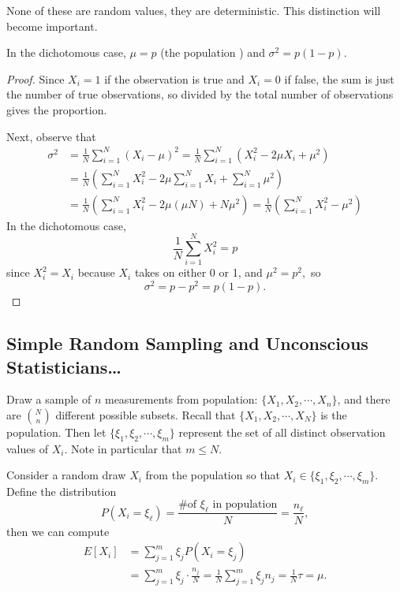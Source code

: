 \documentclass{article}
\begin{document}
\begin{remark}
	None of these are random values, they are deterministic. This distinction will become important.
\end{remark}

\begin{proposition}
	In the dichotomous case, $\mu=p$ (the population ) and $\sigma^2=p(1-p).$ 
\end{proposition}

\begin{proof}
	Since $X_i=1$ if the observation is true and $X_i=0$ if false, the sum is just the number of true observations, so divided by the total number of observations gives the proportion.

	Next, observe that 
	\begin{align*}
		\sigma^2&=\frac{1}{N}\sum_{i=1}^N(X_i-\mu)^2=\frac{1}{N}\sum_{i=1}^N(X_i^2-2\mu X_i+\mu^2) \\
		&= \frac{1}{N}\left( \sum_{i=1}^N X_i^2 - 2\mu\sum_{i=1}^N X_i + \sum_{i=1}^N \mu^2 \right) \\
		&= \frac{1}{N}\left( \sum_{i=1}^N X_i^2-2\mu(\mu N) + N\mu^2 \right) = \frac{1}{N}\left( \sum_{i=1}^N X_i^2 - \mu^2 \right)
	\end{align*}
	In the dichotomous case, \[\frac{1}{N}\sum_{i=1}^N X_i^2 = p\] since $X_i^2=X_i$ because $X_i$ takes on either 0 or 1, and $\mu^2=p^2,$ so \[\sigma^2=p-p^2=p(1-p).\]
\end{proof}

\subsection{Simple Random Sampling and Unconscious Statisticians\ldots}
Draw a sample of $n$ measurements from population: $\{X_1, X_2, \cdots, X_n\}$, and there are $\binom{N}{n}$ different possible subsets. Recall that $\{X_1, X_2, \cdots, X_N\}$ is the population. Then let $\{\xi_1, \xi_2, \cdots, \xi_m\}$ represent the set of all distinct observation values of $X_i.$ Note in particular that $m\le N.$

Consider a random draw $X_i$ from the population so that $X_i\in\{\xi_1, \xi_2, \cdots, \xi_m\}.$ Define the distribution \[P(X_i = \xi_\ell)=\frac{\text{\# of }\xi_\ell\text{ in population}}{N} = \frac{n_\ell}{N},\] then we can compute 
\begin{align*}
	E[X_i] &= \sum_{j=1}^m \xi_j P(X_i = \xi_j) \\
	&= \sum_{j=1}^m \xi_j\cdot\frac{n_j}{N} = \frac{1}{N}\sum_{j=1}^m \xi_j n_j = \frac{1}{N}\tau = \mu.
\end{align*}
\end{document}
